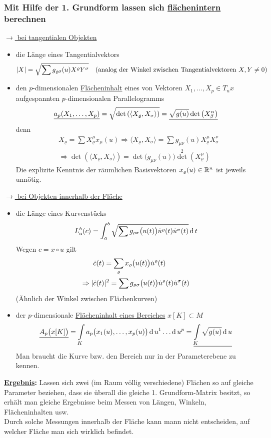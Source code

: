 \subsubsection{Mit Hilfe der 1. Grundform lassen sich \uline{flächenintern} berechnen}
\uline{\(\rightarrow\) bei tangentialen Objekten}
\begin{itemize}
 \item die Länge eines Tangentialvektors 
 \[
  |X| = \sqrt{\sum g_{\varrho \sigma}(u) X^\varrho Y^\sigma} \quad (\text{analog der Winkel zwischen Tangentialvektoren }X,Y \ne 0)
 \]
 \item den \(p\)-dimensionalen \uline{Flächeninhalt} eines von Vektoren \(X_1, \dots, X_p \in T_u x\) aufgespannten \(p\)-dimensionalen Parallelogramms
 \[
  \uline{a_p ( X_1, \dots, X_p)} = \sqrt{\det \left( \left\langle X_\varrho, X_ \sigma \right\rangle \right)} = \uline{\sqrt{g(u)} \det \left(X_\beta^\alpha\right)}
 \]
 denn
 \begin{align*}
  &X_\varrho = \sum X_\varrho^\mu x_\mu(u) \Rightarrow \langle X_\varrho, X_\sigma \rangle = \sum g_{\mu \nu} (u) X_\varrho^\mu X_\sigma^\nu  \\
  &\Rightarrow \det \left(\langle X_\varrho, X_\sigma \rangle \right) = \det \big(g_{\mu \nu}(u)\big)  {\det}^2 \left(X_\varrho^\mu \right)
 \end{align*}
 Die explizite Kenntnis der räumlichen Basisvektoren \(x_\varrho (u) \in \mathbb{R}^n\) ist jeweils unnötig.
\end{itemize}
\uline{\(\rightarrow\) bei Objekten innerhalb der Fläche}
\begin{itemize}
 \item die Länge eines Kurvenstücks
 \[
  L_a^b (c) = \int_a^b \sqrt{\sum g_{\varrho \sigma}\big(u(t)\big) \dot u^\varrho(t) \dot u^\sigma(t)} \operatorname{d} t
 \]
 Wegen \(c = x \circ u\) gilt
 \begin{align*}
  &\dot c(t) = \sum_\varrho x_\varrho \big(u(t)\big) \dot u^\varrho (t) \\
  \Rightarrow | &\dot c (t) |^2 = \sum g_{\varrho \sigma} \big(u(t)\big) \dot u^\varrho (t) \dot u^\sigma (t)
 \end{align*}
(Ähnlich der Winkel zwischen Flächenkurven)
 \item der \(p\)-dimensionale \uline{Flächeninhalt eines Bereiches} \(x[K] \subset M\)
 \[
  \uline{A_p\big(x[K]\big)} = \int\limits_K a_p \big(x_1(u), \dots, x_p(u) \big) \dd u^1 \dots \dd u^p = \uline{\int\limits_K \sqrt{g(u)} \dd u}
 \]
 Man braucht die Kurve bzw. den Bereich nur in der Parameterebene zu kennen.
\end{itemize}
\textbf{\uline{Ergebnis}:} Lassen sich zwei (im Raum völlig verschiedene) Flächen so auf gleiche Parameter beziehen, dass sie überall die gleiche 1. Grundform-Matrix besitzt, so erhält man gleiche Ergebnisse beim Messen von Längen, Winkeln, Flächeninhalten usw. \\
Durch solche Messungen innerhalb der Fläche kann mann nicht entscheiden, auf welcher Fläche man sich wirklich befindet.

